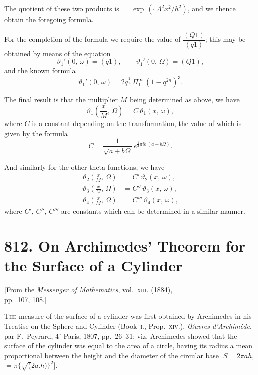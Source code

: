 \documentclass[11pt,a4paper]{article}
\theoremstyle{plain}
\theoremstyle{definition}
\theoremstyle{remark}
\begin{document}
The quotient of these two products is $= \exp\,(\square\,\Lambda^2 x^2/h^2)$, and we thence obtain the foregoing formula.

For the completion of the formula we require the value of $\dfrac{(Q1)}{(q1)}$; this may be obtained by means of the equation
\[
\vartheta_1'(0,\,\omega) = (q1),\qquad \vartheta_1'(0,\,\Omega) = (Q1),
\]
and the known formula
\[
\vartheta_1'(0,\,\omega) = 2q^{\frac{1}{4}}\,\Pi_1^{\infty}\,(1-q^{2n})^3.
\]

The final result is that the multiplier $M$ being determined as above, we have
\[
\vartheta_1\left(\frac{x}{M},\,\Omega\right) = C\,\vartheta_1(x,\,\omega),
\]
where $C$ is a constant depending on the transformation, the value of which is given by the formula
\[
C = \frac{1}{\sqrt{a+b\Omega}}\,e^{\frac{1}{4}\pi i b\,(a+b\Omega)}.
\]

And similarly for the other theta-functions, we have
\begin{align*}
\vartheta_2\left(\frac{x}{M},\,\Omega\right) &= C'\,\vartheta_2(x,\,\omega),\\
\vartheta_3\left(\frac{x}{M},\,\Omega\right) &= C''\,\vartheta_3(x,\,\omega),\\
\vartheta_4\left(\frac{x}{M},\,\Omega\right) &= C'''\,\vartheta_4(x,\,\omega),
\end{align*}
where $C'$, $C''$, $C'''$ are constants which can be determined in a similar manner.


\newpage
\section*{812. On Archimedes' Theorem for the Surface of a Cylinder}

\begin{center}
\small[From the \textit{Messenger of Mathematics}, vol.~\textsc{xiii}. (1884),\\
pp.~107, 108.]
\end{center}

\bigskip

\noindent
\textsc{The} measure of the surface of a cylinder was first obtained by Archimedes in his Treatise on the Sphere and Cylinder (Book~\textsc{i.}, Prop.~\textsc{xiv.}), \textit{\OE uvres d'Archim\`{e}de}, par F.~Peyrard, 4$^{\circ}$ Paris, 1807, pp.~26--31; viz. Archimedes showed that the surface of the cylinder was equal to the area of a circle, having its radius a mean proportional between the height and the diameter of the circular base [$S = 2\pi ah$, $= \pi\{\surd(2a.h)\}^2$].
\end{document}
